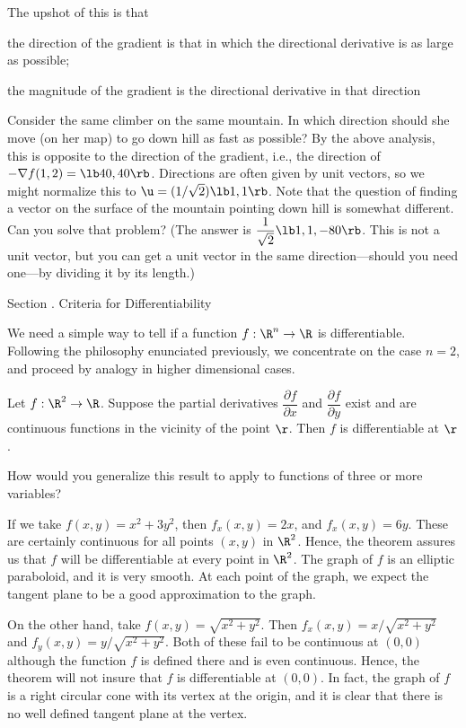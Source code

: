 The upshot of this is that
\roster
\item  the direction of the gradient is that in which the
directional derivative is as large as possible;
\item  the magnitude of the gradient is the directional derivative
in that direction
\endroster
{}%

Consider the same climber on the same mountain.  In which direction
should she move (on her map) to go down hill as fast as
possible?  By the above analysis, this is opposite
to the direction of the
gradient, i.e., the direction of  $-\nabla f(1,2) = \lb 40, 40 \rb$.
Directions are often given by unit vectors, so we might normalize
this to $\u = (1/\sqrt 2)\lb 1, 1 \rb$.
Note that the question of finding a vector on the surface of
the mountain pointing down hill is somewhat different.  Can
you solve that problem? (The answer is $\dfrac 1{\sqrt{2}}\lb 1, 1, -80 \rb$.
This is not a unit vector, but you can get a unit vector
in the same direction---should you need one---by dividing it by its length.)
\endexample
\bigskip

\bigskip
{}
\head Section \sn. Criteria for Differentiability \endhead


We need a simple way to tell if a function $f:\R^n \to \R$ is
differentiable.  Following the philosophy enunciated previously,
we concentrate on the case $n = 2$, and proceed by analogy in
higher dimensional cases.
%

\nextthm
{} Let $f:\R^2 \to \R$.  Suppose the
partial derivatives $\dfrac{\partial f}{\partial x}$ and
$\dfrac{\partial f}{\partial y}$ exist and are continuous
functions in the vicinity of the point $\r$.   Then $f$ is
differentiable at $\r$.
\endproclaim

How would you generalize this result to apply to functions of
three or more variables?

If we take $f(x,y) = x^2 + 3 y^2$, then $f_x(x,y) = 2x$,
and $f_x(x,y) = 6y$. These are certainly continuous for
all points $(x,y)$ in $\R^2$.  Hence, the theorem assures us that
$f$ will be differentiable at every point in $\R^2$.
The graph of $f$ is an elliptic paraboloid,
and it is very smooth.  At each point of the graph, we expect the
tangent plane to be a good approximation to the graph.

On the other hand, take  $f(x,y) = \sqrt{x^2 + y^2}$.   Then
$f_x(x,y) = x/\sqrt{x^2 + y^2}$ and $f_y(x,y) = y/\sqrt{x^2 + y^2}$.
Both of these fail to be continuous at $(0,0)$ although the
function $f$ is defined there and is even continuous.   Hence,
the theorem will not insure that $f$ is differentiable at
$(0,0)$.  In fact, the graph of $f$ is a right circular cone
with its vertex at the origin, and it is clear that there is
no well defined tangent plane at the vertex.
\endexample

